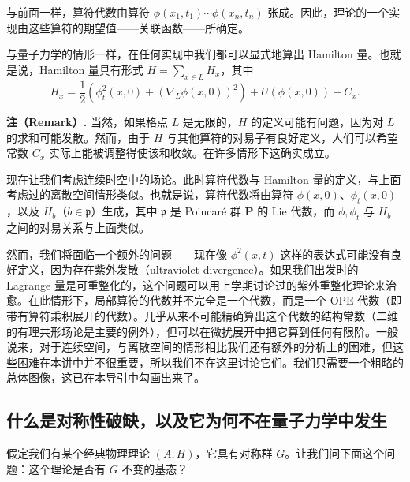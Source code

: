 与前面一样，算符代数由算符 $\phi(x_1,t_1)\cdots\phi(x_n,t_n)$ 张成。因此，理论的一个实现由这些算符的期望值——关联函数——所确定。

与量子力学的情形一样，在任何实现中我们都可以显式地算出 Hamilton 量。也就是说，Hamilton 量具有形式 $H=\sum_{x\in L}H_x$，其中
\[
H_x=\frac12\left(\phi_t^2(x,0)+(\nabla_L\phi(x,0))^2\right)+U(\phi(x,0))+C_x.
\]

\textbf{注（Remark）.}
当然，如果格点 $L$ 是无限的，$H$ 的定义可能有问题，因为对 $L$ 的求和可能发散。然而，由于 $H$ 与其他算符的对易子有良好定义，人们可以希望常数 $C_x$ 实际上能被调整得使该和收敛。在许多情形下这确实成立。


现在让我们考虑连续时空中的场论。此时算符代数与 Hamilton 量的定义，与上面考虑过的离散空间情形类似。也就是说，算符代数将由算符 $\phi(x,0)$、$\phi_t(x,0)$，以及 $H_b$（$b\in\mathfrak{p}$）生成，其中 $\mathfrak{p}$ 是 Poincaré 群 $\mathbf{P}$ 的 Lie 代数，而 $\phi,\phi_t$ 与 $H_b$ 之间的对易关系与上面类似。

然而，我们将面临一个额外的问题——现在像 $\phi^2(x,t)$ 这样的表达式可能没有良好定义，因为存在紫外发散（ultraviolet divergence）。如果我们出发时的 Lagrange 量是可重整化的，这个问题可以用上学期讨论过的紫外重整化理论来治愈。在此情形下，局部算符的代数并不完全是一个代数，而是一个 OPE 代数（即带有算符乘积展开的代数）。几乎从来不可能精确算出这个代数的结构常数（二维的有理共形场论是主要的例外），但可以在微扰展开中把它算到任何有限阶。一般说来，对于连续空间，与离散空间的情形相比我们还有额外的分析上的困难，但这些困难在本讲中并不很重要，所以我们不在这里讨论它们。我们只需要一个粗略的总体图像，这已在本导引中勾画出来了。

\subsection{什么是对称性破缺，以及它为何不在量子力学中发生}

假定我们有某个经典物理理论 $(A,H)$，它具有对称群 $G$。让我们问下面这个问题：这个理论是否有 $G$ 不变的基态？

